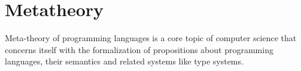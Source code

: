 
\section{Metatheory}
Meta-theory of programming languages is a core topic of computer science that
concerns itself with the formalization of propositions about programming
languages, their semantics and related systems like type systems.
